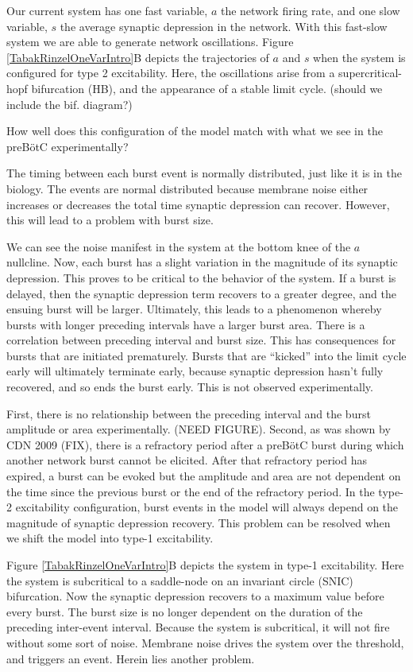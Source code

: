 \documentclass[12pt]{article}
\def\pre{preB\"otC\xspace}
\begin{document}
Our current system has one fast variable, $a$ the network firing rate, and one slow variable, $s$ the average synaptic depression in the network. With this fast-slow system we are able to generate network oscillations. Figure \ref{TabakRinzelOneVarIntro}B depicts the trajectories of $a$ and $s$ when the system is configured for type 2 excitability. Here, the oscillations arise from a supercritical-hopf bifurcation (HB), and the appearance of a stable limit cycle. (should we include the bif. diagram?)

How well does this configuration of the model match with what we see in the preB\"otC experimentally? 


The timing between each burst event is normally distributed, just like it is in the biology. The events are normal distributed because membrane noise either increases or decreases the total time synaptic depression can recover. However, this will lead to a problem with burst size.

We can see the noise manifest in the system at the bottom knee of the $a$ nullcline. Now, each burst has a slight variation in the magnitude of its synaptic depression. This proves to be critical to the behavior of the system. If a burst is delayed, then the synaptic depression term recovers to a greater degree, and the ensuing burst will be larger. Ultimately, this leads to a phenomenon whereby bursts with longer preceding intervals have a larger burst area. There is a correlation between preceding interval and burst size. This has consequences for bursts that are initiated prematurely. Bursts that are ``kicked'' into the limit cycle early will ultimately terminate early, because synaptic depression hasn't fully recovered, and so ends the burst early. This is not observed experimentally. 

First, there is no relationship between the preceding interval and the burst amplitude or area experimentally. (NEED FIGURE). Second, as was shown by CDN 2009 (FIX), there is a refractory period after a \pre burst during which another network burst cannot be elicited. After that refractory period has expired, a burst can be evoked but the amplitude and area are not dependent on the time since the previous burst or the end of the refractory period. In the type-2 excitability configuration, burst events in the model will always depend on the magnitude of synaptic depression recovery. This problem can be resolved when we shift the model into type-1 excitability.  

Figure \ref{TabakRinzelOneVarIntro}B depicts the system in type-1 excitability. Here the system is subcritical to a saddle-node on an invariant circle (SNIC) bifurcation. Now the synaptic depression recovers to a maximum value before every burst. The burst size is no longer dependent on the duration of the preceding inter-event interval. Because the system is subcritical, it will not fire without some sort of noise. Membrane noise drives the system over the threshold, and triggers an event. Herein lies another problem.
\end{document}
